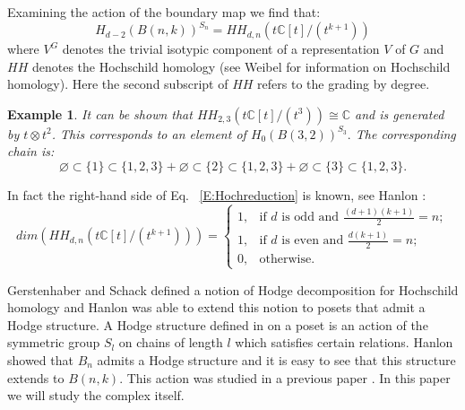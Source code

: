\documentclass{elsart}
\newtheorem{example}[theorem]{Example}
\newcommand{\C}{\mathbb{C}}
\begin{document}
Examining the action of the boundary map we find that:
\begin{equation} \label{E:Hochreduction}
  H_{d-2}(B(n, k))^{S_n} = HH_{d, n}(t\C[t]/(t^{k+1}))
\end{equation}
where $V^G$  denotes the trivial isotypic component of a representation $V$ of $G$ and $HH$ denotes the Hochschild 
homology (see Weibel \cite{Weibel} for information on Hochschild homology). Here the second 
subscript of $HH$ refers to the grading by degree. 

\begin{example}

  It can be shown that $HH_{2,3}(t\C[t]/(t^3)) \cong \C$ and is generated by $t \otimes t^2$. 
  This  
  corresponds to an element of $H_0(B(3, 2))^{S_3}.$ The corresponding chain is:
  $$ \varnothing \subset \{1\} \subset \{1, 2, 3\} + \varnothing \subset \{2\} \subset \{1, 2, 3\} + \varnothing \subset 
     \{3\} \subset \{1, 2, 3\}.$$
\end{example}

In fact the right-hand side of Eq. ~\ref{E:Hochreduction} is known, see 
Hanlon \cite{HanlonMac}:
\begin{equation} \label{E:HH}
  dim(HH_{d, n}(t\C[t]/(t^{k+1}))) = 
  \begin{cases} 
   1, &\text{if $d$ is odd and $\frac{(d+1)(k+1)}{2} = n;$}\\
   1, &\text{if $d$ is even and $\frac{d(k+1)}{2} = n;$}\\
   0, &\text{otherwise.}
  \end{cases}
\end{equation}

Gerstenhaber and Schack \cite{GS} defined a notion of Hodge decomposition for Hochschild homology and Hanlon \cite{Hanlon}
was able to extend this notion to posets that admit a Hodge structure. A Hodge structure defined in \cite{Hanlon} on a 
poset is an action of the symmetric group
$S_l$ on chains of length $l$ which satisfies certain 
relations. Hanlon showed that $B_n$ admits a Hodge structure and it is easy to see that this structure extends to $B(n, k)$.
This action was studied in a previous paper \cite{S1}. 
In this paper we will study the complex itself.
\end{document}
